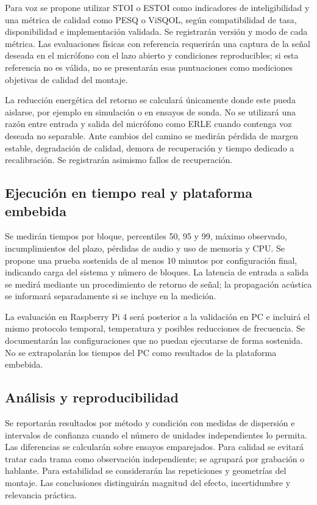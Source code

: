 Para voz se propone utilizar STOI\cite{taal2011} o ESTOI como indicadores de inteligibilidad y una métrica de calidad como PESQ o ViSQOL, según compatibilidad de tasa, disponibilidad e implementación validada. Se registrarán versión y modo de cada métrica. Las evaluaciones físicas con referencia requerirán una captura de la señal deseada en el micrófono con el lazo abierto y condiciones reproducibles; si esta referencia no es válida, no se presentarán esas puntuaciones como mediciones objetivas de calidad del montaje.

La reducción energética del retorno se calculará únicamente donde este pueda aislarse, por ejemplo en simulación o en ensayos de sonda. No se utilizará una razón entre entrada y salida del micrófono como ERLE cuando contenga voz deseada no separable. Ante cambios del camino se medirán pérdida de margen estable, degradación de calidad, demora de recuperación y tiempo dedicado a recalibración. Se registrarán asimismo fallos de recuperación.

\subsection{Ejecución en tiempo real y plataforma embebida}
Se medirán tiempos por bloque, percentiles 50, 95 y 99, máximo observado, incumplimientos del plazo, pérdidas de audio y uso de memoria y CPU. Se propone una prueba sostenida de al menos 10 minutos por configuración final, indicando carga del sistema y número de bloques. La latencia de entrada a salida se medirá mediante un procedimiento de retorno de señal; la propagación acústica se informará separadamente si se incluye en la medición.

La evaluación en Raspberry Pi 4 será posterior a la validación en PC e incluirá el mismo protocolo temporal, temperatura y posibles reducciones de frecuencia. Se documentarán las configuraciones que no puedan ejecutarse de forma sostenida. No se extrapolarán los tiempos del PC como resultados de la plataforma embebida.

\subsection{Análisis y reproducibilidad}
Se reportarán resultados por método y condición con medidas de dispersión e intervalos de confianza cuando el número de unidades independientes lo permita. Las diferencias se calcularán sobre ensayos emparejados. Para calidad se evitará tratar cada trama como observación independiente; se agrupará por grabación o hablante. Para estabilidad se considerarán las repeticiones y geometrías del montaje. Las conclusiones distinguirán magnitud del efecto, incertidumbre y relevancia práctica.

